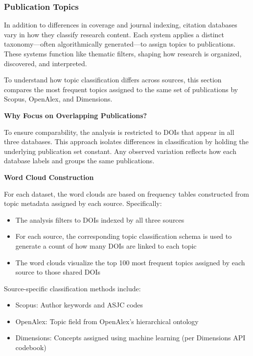 \documentclass[
  letterpaper,
  DIV=11,
  numbers=noendperiod]{scrartcl}
\providecommand{\tightlist}{%
  \setlength{\itemsep}{0pt}\setlength{\parskip}{0pt}}\usepackage{longtable,booktabs,array}
\begin{document}
\subsubsection{Publication Topics}\label{publication-topics}

In addition to differences in coverage and journal indexing, citation
databases vary in how they classify research content. Each system
applies a distinct taxonomy---often algorithmically generated---to
assign topics to publications. These systems function like thematic
filters, shaping how research is organized, discovered, and interpreted.

To understand how topic classification differs across sources, this
section compares the most frequent topics assigned to the same set of
publications by Scopus, OpenAlex, and Dimensions.

\textbf{Why Focus on Overlapping Publications?}

To ensure comparability, the analysis is restricted to DOIs that appear
in all three databases. This approach isolates differences in
classification by holding the underlying publication set constant. Any
observed variation reflects how each database labels and groups the same
publications.

\textbf{Word Cloud Construction}

For each dataset, the word clouds are based on frequency tables
constructed from topic metadata assigned by each source. Specifically:

\begin{itemize}
\tightlist
\item
  The analysis filters to DOIs indexed by all three sources
\item
  For each source, the corresponding topic classification schema is used
  to generate a count of how many DOIs are linked to each topic
\item
  The word clouds visualize the top 100 most frequent topics assigned by
  each source to those shared DOIs
\end{itemize}

Source-specific classification methods include:

\begin{itemize}
\tightlist
\item
  Scopus: Author keywords and ASJC codes
\item
  OpenAlex: Topic field from OpenAlex's hierarchical ontology
\item
  Dimensions: Concepts assigned using machine learning (per Dimensions
  API codebook)
\end{itemize}
\end{document}
